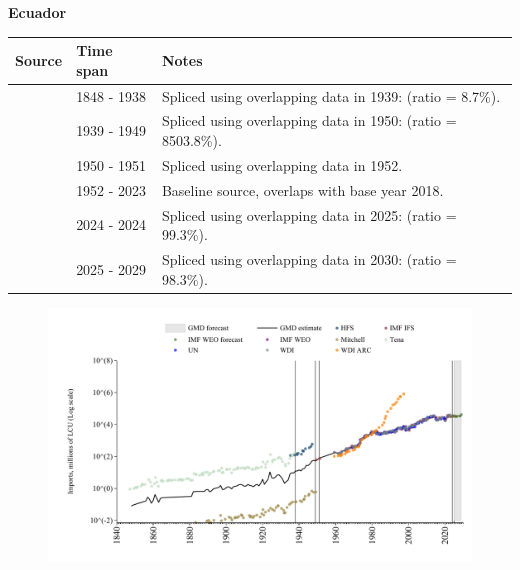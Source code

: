 \documentclass[12pt,a4paper,landscape]{article}
\begin{document}
\begin{adjustbox}{max totalsize={\paperwidth}{\paperheight},center}
\begin{minipage}[t][\textheight][t]{\textwidth}
\vspace*{0.5cm}
{}
\begin{center}
{\Large\bfseries Ecuador}
\end{center}
\vspace{0.5cm}
\begin{table}[H]
\centering
\small
\begin{tabular}{|l|l|l|}
\hline
\textbf{Source} & \textbf{Time span} & \textbf{Notes} \\
\hline
\rowcolor{white}\cite{Tena}& 1848 - 1938 &Spliced using overlapping data in 1939: (ratio = 8.7\%).\\
\rowcolor{lightgray}\cite{Mitchell}& 1939 - 1949 &Spliced using overlapping data in 1950: (ratio = 8503.8\%).\\
\rowcolor{white}\cite{IMF_IFS}& 1950 - 1951 &Spliced using overlapping data in 1952.\\
\rowcolor{lightgray}\cite{WDI}& 1952 - 2023 &Baseline source, overlaps with base year 2018.\\
\rowcolor{white}\cite{IMF_IFS}& 2024 - 2024 &Spliced using overlapping data in 2025: (ratio = 99.3\%).\\
\rowcolor{lightgray}\cite{IMF_WEO_forecast}& 2025 - 2029 &Spliced using overlapping data in 2030: (ratio = 98.3\%).\\
\hline
\end{tabular}
\end{table}
\begin{figure}[H]
\centering
\includegraphics[width=\textwidth,height=0.6\textheight,keepaspectratio]{graphs/ECU_imports.pdf}
\end{figure}
\end{minipage}
\end{adjustbox}
\end{document}
